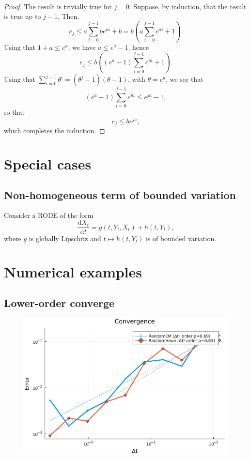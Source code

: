 \documentclass[reqno,12pt]{amsart}
\theoremstyle{plain}%
\theoremstyle{definition}
\begin{document}
\begin{proof}
  The result is trivially true for $j=0$. Suppose, by induction, that the result is true up to $j-1$. Then,
  $$
  e_j \leq a \sum_{i=0}^{j-1} be^{ai} + b = b \left(a \sum_{i=0}^{j-1} e^{ai} + 1\right).
  $$
  Using that $1 + a \leq e^a$, we have $a \leq e^a - 1$, hence
  $$
  e_j \leq b\left((e^a - 1)\sum_{i=0}^{j-1} e^{ia} + 1\right).
  $$
  Using that $\sum_{i=0}^{j-1} \theta^i = (\theta^j - 1)(\theta - 1)$, with $\theta = e^a$, we see that
  $$
  (e^a - 1)\sum_{i=0}^{j-1} e^{ia} \leq e^{ja} - 1,
  $$
  so that
  $$
  e_j \leq be^{ja},
  $$
  which completes the induction.
\end{proof}

\section{Special cases}

\subsection{Non-homogeneous term of bounded variation}

Consider a RODE of the form
\[
\frac{\mathrm{d}X_t}{\mathrm{d}t} = g(t, Y_t, X_t) + h(t, Y_t),    
\]
where $g$ is globally Lipschitz and $t \mapsto h(t, Y_t)$ is of bounded variation.

\section{Numerical examples}

\subsection{Lower-order converge}

\begin{figure}
  \includegraphics[scale=0.8]{img/plot_13.png}
\end{figure}
\end{document}

